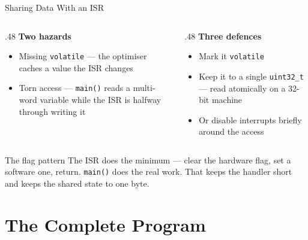 \documentclass[9pt,aspectratio=169,xcolor=table]{beamer}
\begin{document}
\begin{frame}{Sharing Data With an ISR}
    \begin{columns}[T]
    \begin{column}{.48\textwidth}
        \textbf{Two hazards}
        {\small
        \begin{itemize}\itemsep1pt
            \item \alert{Missing \texttt{volatile}} --- the optimiser caches a
                  value the ISR changes
            \item \alert{Torn access} --- \texttt{main()} reads a multi-word
                  variable while the ISR is halfway through writing it
        \end{itemize}}
    \end{column}
    \begin{column}{.48\textwidth}
        \textbf{Three defences}
        {\small
        \begin{itemize}\itemsep1pt
            \item Mark it \texttt{volatile}
            \item Keep it to a single \texttt{uint32\_t} --- read atomically on a
                  32-bit machine
            \item Or disable interrupts \alert{briefly} around the access
        \end{itemize}}
    \end{column}
    \end{columns}

    \vspace{3mm}
    \begin{block}{The flag pattern}
        The ISR does the minimum --- clear the hardware flag, set a software one,
        return. \texttt{main()} does the real work. That keeps the handler short
        \alert{and} keeps the shared state to one byte.
    \end{block}
\end{frame}


\section{The Complete Program}
\end{document}
